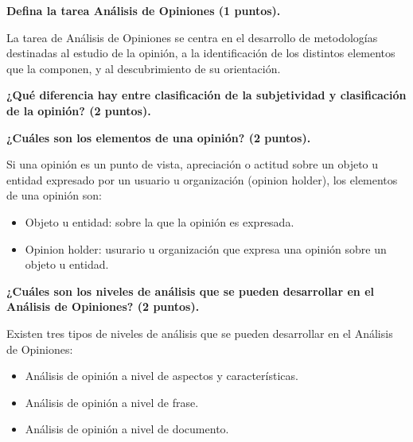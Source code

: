 \documentclass[11pt]{exam}
\begin{document}
\begin{questions}
{\bf \question Defina la tarea Análisis de Opiniones (1 puntos).}

La tarea de Análisis de Opiniones se centra en el desarrollo de metodologías destinadas al estudio de la opinión, a la identificación de los distintos elementos que la componen, y al descubrimiento de su orientación.

{\bf \question ¿Qué diferencia hay entre clasificación de la subjetividad y clasificación de la opinión? (2 puntos).}

{\bf \question ¿Cuáles son los elementos de una opinión? (2 puntos).}

Si una opinión es un punto de vista, apreciación o actitud sobre un objeto u entidad expresado por un usuario u organización (opinion holder), los elementos de una opinión son:

\begin{itemize}
	\item Objeto u entidad: sobre la que la opinión es expresada.
	\item Opinion holder: usurario u organización que expresa una opinión sobre un objeto u entidad.
\end{itemize}

{\bf \question ¿Cuáles son los niveles de análisis que se pueden desarrollar en el Análisis de Opiniones? (2 puntos).}

Existen tres tipos de niveles de análisis que se pueden desarrollar en el Análisis de Opiniones:

\begin{itemize}
	\item Análisis de opinión a nivel de aspectos y características.
	\item Análisis de opinión a nivel de frase.
	\item Análisis de opinión a nivel de documento.
\end{itemize}

\end{questions}
	
\end{document}
